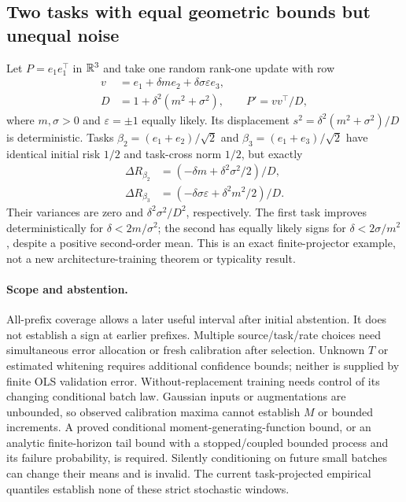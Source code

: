 \subsection{Two tasks with equal geometric bounds but unequal noise}
Let $P=e_1e_1^\top$ in $\mathbb R^3$ and take one random rank-one update with row
\begin{align}
 v&=e_1+\delta me_2+\delta\sigma\varepsilon e_3,\nonumber\\
 D&=1+\delta^2(m^2+\sigma^2),\qquad P'=vv^\top/D,
\end{align}
where $m,\sigma>0$ and $\varepsilon=\pm1$ equally likely. Its displacement $s^2=\delta^2(m^2+\sigma^2)/D$ is deterministic. Tasks $\beta_2=(e_1+e_2)/\sqrt2$ and $\beta_3=(e_1+e_3)/\sqrt2$ have identical initial risk $1/2$ and task-cross norm $1/2$, but exactly
\begin{align}
 \Delta R_{\beta_2}&=(-\delta m+\delta^2\sigma^2/2)/D,\\
 \Delta R_{\beta_3}&=(-\delta\sigma\varepsilon+\delta^2m^2/2)/D.
\end{align}
Their variances are zero and $\delta^2\sigma^2/D^2$, respectively. The first task improves deterministically for $\delta<2m/\sigma^2$; the second has equally likely signs for $\delta<2\sigma/m^2$, despite a positive second-order mean. This is an exact finite-projector example, not a new architecture-training theorem or typicality result.

\paragraph{Scope and abstention.}
All-prefix coverage allows a later useful interval after initial abstention. It does not establish a sign at earlier prefixes. Multiple source/task/rate choices need simultaneous error allocation or fresh calibration after selection. Unknown $T$ or estimated whitening requires additional confidence bounds; neither is supplied by finite OLS validation error. Without-replacement training needs control of its changing conditional batch law. Gaussian inputs or augmentations are unbounded, so observed calibration maxima cannot establish $M$ or bounded increments. A proved conditional moment-generating-function bound, or an analytic finite-horizon tail bound with a stopped/coupled bounded process and its failure probability, is required. Silently conditioning on future small batches can change their means and is invalid. The current task-projected empirical quantiles establish none of these strict stochastic windows.

